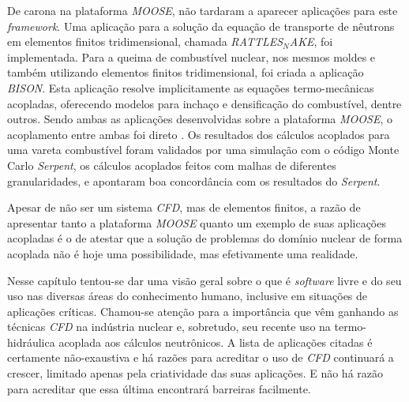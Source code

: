 De carona na plataforma \textit{MOOSE}, não tardaram a aparecer aplicações para
este \textit{framework}. Uma aplicação para a solução da equação de transporte
de nêutrons em elementos finitos tridimensional, chamada \textit{RATTLES$_{N}$AKE},
foi implementada. Para a queima de combustível nuclear, nos mesmos moldes e
também utilizando elementos finitos tridimensional, foi criada a aplicação
\textit{BISON}. Esta aplicação resolve implicitamente as equações termo-mecânicas
acopladas, oferecendo modelos para inchaço e densificação do combustível, dentre outros.
Sendo ambas as aplicações desenvolvidas sobre a plataforma \textit{MOOSE}, o acoplamento
entre ambas foi direto \cite{Gleicher2014}.
Os resultados dos cálculos acoplados para uma vareta combustível foram validados por uma simulação com o código Monte Carlo \textit{Serpent},
os cálculos acoplados feitos com malhas de diferentes granularidades, e apontaram boa
concordância com os resultados do \textit{Serpent}.

Apesar de não ser um sistema \textit{CFD}, mas de elementos finitos, a razão de
apresentar tanto a plataforma \textit{MOOSE} quanto um exemplo de suas aplicações
acopladas é o de atestar que a solução de problemas do domínio nuclear de forma
acoplada não é hoje uma possibilidade, mas efetivamente uma realidade.

Nesse capítulo tentou-se dar uma visão geral sobre o que é \textit{software} livre e do
seu uso nas diversas áreas do conhecimento humano, inclusive em situações de aplicações
críticas. Chamou-se atenção para a importância que vêm ganhando as técnicas \textit{CFD} na
indústria nuclear e, sobretudo, seu recente uso na termo-hidráulica acoplada aos cálculos
neutrônicos. A lista de aplicações citadas é certamente não-exaustiva e há razões para
acreditar o uso de \textit{CFD} continuará a crescer, limitado apenas pela criatividade
das suas aplicações. E não há razão para acreditar que essa última encontrará barreiras
facilmente.




%

